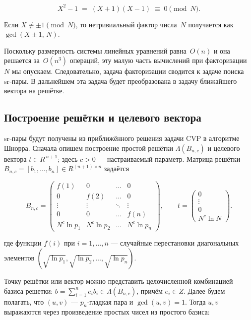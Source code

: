 \begin{equation}
  X^{2}-1 \;=\; (X+1)(X-1) \;\equiv\; 0 \pmod{N}.
\end{equation}

Если $X \not\equiv \pm1 \pmod{N}$, то нетривиальный фактор числа $N$ получается
как $\gcd(X \pm 1,\, N)$.

Поскольку размерность системы линейных уравнений равна~$O(n)$ и она решается
за~$O(n^{3})$ операций, эту малую часть вычислений при факторизации~$N$ мы
опускаем. Следовательно, задача факторизации сводится к задаче поиска sr‑пары.
В дальнейшем эта задача будет преобразована в задачу ближайшего вектора на
решётке.

\subsection*{Построение решётки и целевого вектора}

sr‑пары будут получены из приближённого решения задачи CVP в алгоритме Шнорра.
Сначала опишем построение простой решётки $\Lambda(B_{n,c})$ и целевого вектора
$t\in R^{\,n+1}$; здесь $c>0$ — настраиваемый параметр. Матрица решётки
$B_{n,c}=[b_{1},\dots,b_{n}]\in R^{(n+1)\times n}$ задаётся

\begin{equation}
  B_{n,c} =
  \begin{pmatrix}
    f(1)      & 0        & \dots & 0        \\
    0         & f(2)     & \dots & 0        \\
    \vdots    & \vdots   & \ddots& \vdots   \\
    0         & 0        & \dots & f(n)     \\
    N^{c}\ln p_{1} & N^{c}\ln p_{2} & \dots & N^{c}\ln p_{n}
  \end{pmatrix},
  \qquad
  t =
  \begin{pmatrix}
    0 \\[2pt]
    \vdots \\[2pt]
    0 \\[2pt]
    N^{c}\ln N
  \end{pmatrix}.
\end{equation}

где функции $f(i)$ при $i=1,\dots,n$ — случайные перестановки диагональных
элементов $(\sqrt{\ln p_{1}},\sqrt{\ln p_{2}},\dots, \sqrt{\ln p_{n}})$.

Точку решётки или вектор можно представить целочисленной комбинацией базиса
решетки: $b=\sum_{i=1}^{n} e_{i} b_{i}\in\Lambda(B_{n,c})$, причём $e_{i}\in
Z$. Далее будем полагать, что $(u,v)$ — $p_{n}$‑гладкая пара и $\gcd(u,v)=1$.
Тогда $u,v$ выражаются через произведение простых чисел из простого базиса:

